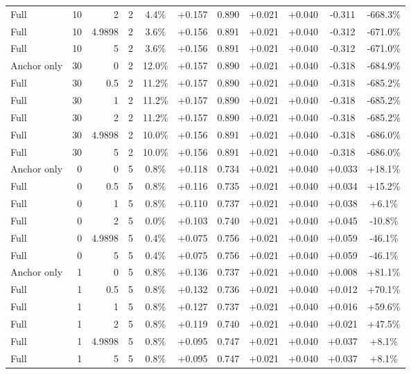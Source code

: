 \begin{table}[htbp]
\begin{tabular}{lrrrccccccc}
Full & 10 & 2 & 2 & 4.4\% & +0.157 & 0.890 & +0.021 & +0.040 & -0.311 & -668.3\% \\
Full & 10 & 4.9898 & 2 & 3.6\% & +0.156 & 0.891 & +0.021 & +0.040 & -0.312 & -671.0\% \\
Full & 10 & 5 & 2 & 3.6\% & +0.156 & 0.891 & +0.021 & +0.040 & -0.312 & -671.0\% \\
Anchor only & 30 & 0 & 2 & 12.0\% & +0.157 & 0.890 & +0.021 & +0.040 & -0.318 & -684.9\% \\
Full & 30 & 0.5 & 2 & 11.2\% & +0.157 & 0.890 & +0.021 & +0.040 & -0.318 & -685.2\% \\
Full & 30 & 1 & 2 & 11.2\% & +0.157 & 0.890 & +0.021 & +0.040 & -0.318 & -685.2\% \\
Full & 30 & 2 & 2 & 11.2\% & +0.157 & 0.890 & +0.021 & +0.040 & -0.318 & -685.2\% \\
Full & 30 & 4.9898 & 2 & 10.0\% & +0.156 & 0.891 & +0.021 & +0.040 & -0.318 & -686.0\% \\
Full & 30 & 5 & 2 & 10.0\% & +0.156 & 0.891 & +0.021 & +0.040 & -0.318 & -686.0\% \\
Anchor only & 0 & 0 & 5 & 0.8\% & +0.118 & 0.734 & +0.021 & +0.040 & +0.033 & +18.1\% \\
Full & 0 & 0.5 & 5 & 0.8\% & +0.116 & 0.735 & +0.021 & +0.040 & +0.034 & +15.2\% \\
Full & 0 & 1 & 5 & 0.8\% & +0.110 & 0.737 & +0.021 & +0.040 & +0.038 & +6.1\% \\
Full & 0 & 2 & 5 & 0.0\% & +0.103 & 0.740 & +0.021 & +0.040 & +0.045 & -10.8\% \\
Full & 0 & 4.9898 & 5 & 0.4\% & +0.075 & 0.756 & +0.021 & +0.040 & +0.059 & -46.1\% \\
Full & 0 & 5 & 5 & 0.4\% & +0.075 & 0.756 & +0.021 & +0.040 & +0.059 & -46.1\% \\
Anchor only & 1 & 0 & 5 & 0.8\% & +0.136 & 0.737 & +0.021 & +0.040 & +0.008 & +81.1\% \\
Full & 1 & 0.5 & 5 & 0.8\% & +0.132 & 0.736 & +0.021 & +0.040 & +0.012 & +70.1\% \\
Full & 1 & 1 & 5 & 0.8\% & +0.127 & 0.737 & +0.021 & +0.040 & +0.016 & +59.6\% \\
Full & 1 & 2 & 5 & 0.8\% & +0.119 & 0.740 & +0.021 & +0.040 & +0.021 & +47.5\% \\
Full & 1 & 4.9898 & 5 & 0.8\% & +0.095 & 0.747 & +0.021 & +0.040 & +0.037 & +8.1\% \\
Full & 1 & 5 & 5 & 0.8\% & +0.095 & 0.747 & +0.021 & +0.040 & +0.037 & +8.1\% \\

\end{tabular}
\end{table}
